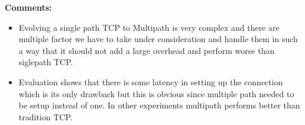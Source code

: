 \documentclass[a4paper,12pt, twoside]{article}
\begin{document}
\textbf{Comments:}
\begin{itemize}
	\item Evolving a single path TCP to Multipath is very complex and there are multiple factor we have to take under consideration and handle them in such a way that it should not add a large overhead and perform worse than siglepath TCP.
	\item Evaluation shows that there is some latency in setting up the connection which is its only drawback but this is obvious since multiple path needed to be setup instead of one. In other experiments multipath performs better than tradition TCP.
\end{itemize}
\end{document}
